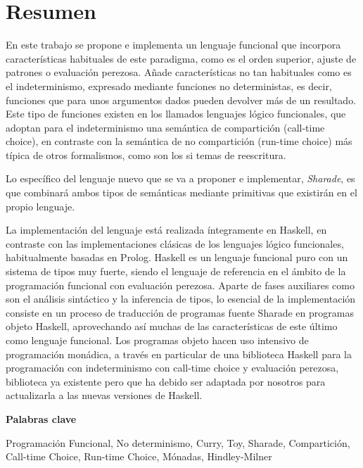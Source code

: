 \documentclass[class=article, crop=false]{standalone}
\begin{document}
\section{Resumen}

En este trabajo se propone e implementa un lenguaje funcional que incorpora características
habituales de este paradigma, como es el orden superior, ajuste de patrones o evaluación
perezosa. Añade características no tan habituales como es el indeterminismo, expresado
mediante funciones no deterministas, es decir, funciones que para unos argumentos dados
pueden devolver más de un resultado. Este tipo de funciones existen en los llamados lenguajes
lógico funcionales, que adoptan para el indeterminismo una semántica de compartición
(call-time choice), en contraste con la semántica de no compartición (run-time choice) más
típica de otros formalismos, como son los si temas de reescritura.

Lo específico del lenguaje nuevo que se va a proponer e implementar, \textit{Sharade}, es que
combinará ambos tipos de semánticas mediante primitivas que existirán en el propio lenguaje.

La implementación del lenguaje está realizada íntegramente en Haskell, en contraste con las
implementaciones clásicas de los lenguajes lógico funcionales, habitualmente basadas en
Prolog. Haskell es un lenguaje funcional puro con un sistema de tipos muy fuerte, siendo el
lenguaje de referencia en el ámbito de la programación funcional con evaluación perezosa.
Aparte de fases auxiliares como son el análisis sintáctico y la inferencia de tipos, lo
esencial de la implementación consiste en un proceso de traducción de programas fuente
Sharade en programas objeto Haskell, aprovechando así muchas de las características de este
último como lenguaje funcional. Los programas objeto hacen uso intensivo de programación
monádica, a través en particular de una biblioteca Haskell para la programación con
indeterminismo con call-time choice y evaluación perezosa, biblioteca ya existente pero que
ha debido ser adaptada por nosotros para actualizarla a las nuevas versiones de Haskell.

\vspace{0.5cm}
\textbf{Palabras clave}

Programación Funcional, No determinismo, Curry, Toy, Sharade, Compartición, Call-time Choice,
Run-time Choice, Mónadas, Hindley-Milner
\end{document}
